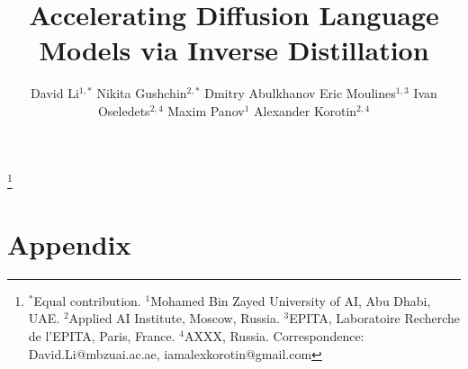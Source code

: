 \documentclass{article} %
\title{Accelerating Diffusion Language Models via Inverse Distillation}
\author{David Li$^{1,*}$ \quad
Nikita Gushchin$^{2,*}$ \quad
Dmitry Abulkhanov \quad
Eric Moulines$^{1,3}$ \AND
Ivan Oseledets$^{2,4}$ \quad
Maxim Panov$^{1}$ \quad
Alexander Korotin$^{2,4}$
}\vspace{-2mm}
\theoremstyle{plain}
\theoremstyle{definition}
\theoremstyle{remark}
\newcommand\blfootnote[1]{%
  \begingroup
  \renewcommand\thefootnote{}\footnote{#1}%
  \addtocounter{footnote}{-1}%
  \endgroup
}
\begin{document}
\maketitle

\blfootnote{$^{*}$Equal contribution. $^{1}$Mohamed Bin Zayed University of AI, Abu Dhabi, UAE.
  $^{2}$Applied AI Institute, Moscow, Russia. $^{3}$EPITA, Laboratoire Recherche de l'EPITA, Paris, France.
  $^{4}$AXXX, Russia.
  Correspondence: David.Li@mbzuai.ac.ae, \mbox{iamalexkorotin@gmail.com}}



% 



% 

\clearpage

\nocite{langley00}




\newpage
\appendix
\section*{Appendix}









\end{document}

